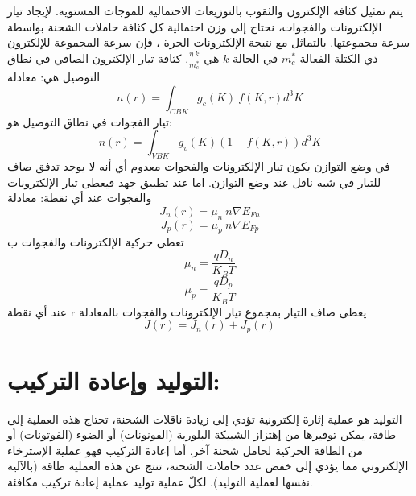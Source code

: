 	يتم تمثيل كثافة الإلكترون والثقوب بالتوزيعات الاحتمالية للموجات المستوية. لإيجاد تيار الإلكترونات والفجوات، نحتاج إلى وزن احتمالية كل كثافة حاملات الشحنة بواسطة سرعة مجموعتها. بالتماثل مع نتيجة الإلكترونات الحرة ، فإن سرعة المجموعة للإلكترون ذي الكتلة الفعالة $ m^{*}_c $ في الحالة $ k $ هي $ \frac{\eta\ k}{ m^{*}_c} $. كثافة تيار الإلكترون الصافي في نطاق التوصيل هي:
	معادلة
	\begin{equation}
		n\left( r \right)= \int_{CBK} g_c\left( K\right)\ f \left( K,r \right)d^{3}K 
	\end{equation}
	تيار الفجوات في نطاق التوصيل هو: 
	\begin{equation}
		n\left( r \right)= \int_{VBK} g_v\left( K\right)\left( 1- f \left( K,r \right)\right) d^{3}K 
	\end{equation}
	في وضع التوازن يكون تيار الإلكترونات والفجوات معدوم أي أنه لا يوجد تدفق صاف للتيار في شبه ناقل عند وضع التوازن.
	اما عند تطبيق جهد فيعطى تيار الإلكترونات والفجوات عند أي نقطة: 
	معادلة 
	\begin{equation}
		J_n\left( r \right)= \mu_{n}\ n \nabla E_{Fn} 
	\end{equation}
	\begin{equation}
		J_p\left( r \right)= \mu_{p}\ n \nabla E_{Fp} 
	\end{equation}
	تعطى حركية الإلكترونات والفجوات ب 
	\begin{equation}
		\mu_{n}= \dfrac{qD_{n}}{K_BT}
	\end{equation}
	\begin{equation}
		\mu_{p}= \dfrac{qD_{p}}{K_BT}
	\end{equation}
	عند أي نقطة r يعطى صاف التيار بمجموع تيار الإلكترونات والفجوات بالمعادلة
	\begin{equation}
		J\left( r \right)= J_{n}\left( r \right)+J_{p}\left( r \right) 
	\end{equation}
	
\section{ التوليد وإعادة التركيب:}
	التوليد هو عملية إثارة إلكترونية تؤدي إلى زيادة ناقلات الشحنة، تحتاج هذه العملية إلى طاقة، يمكن توفيرها من إهتزاز الشبيكة البلورية (الفونونات) أو الضوء (الفوتونات) أو من الطاقة الحركية لحامل شحنة آخر. أما إعادة التركيب فهو عملية الإسترخاء الإلكتروني مما يؤدي إلى خفض عدد حاملات الشحنة، تنتج عن هذه العملية طاقة (بالآلية نفسها لعملية التوليد). لكلّ عملية توليد عملية إعادة تركيب مكافئة.
	
